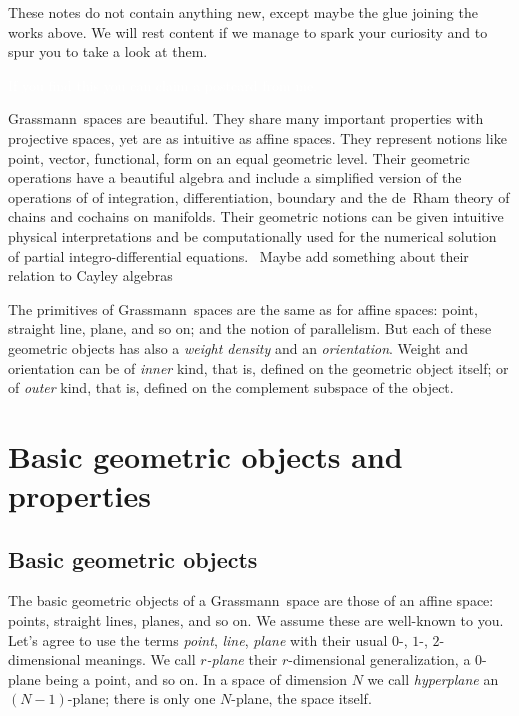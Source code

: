 \documentclass[\ifafour a4paper,12pt,\else a5paper,10pt,\fi%
onecolumn,oneside,article,%
british%
]{memoir}
\theoremstyle{remark}
\theoremstyle{innote}
\renewcommand*{\|}{\nonscript\,\vert\nonscript\;\mathopen{}}
\newcommand*{\puzzle}{{\fontencoding{U}\fontfamily{fontawesometwo}\selectfont\symbol{225}}}
\newcommand{\mynote}[1]{ {\color{notecolour}\puzzle\ #1}}
\newcommand*{\gm}{Grassmann}
\newcommand*{\+}{\boxplus}
\newcommand*{\yr}{r}
\newcommand*{\yN}{N}
\begin{document}
These notes do not contain anything new, except maybe the glue joining the
works above. We will rest content if we manage to spark your curiosity and
to spur you to take a look at them.

\textcolor{white}{If you find this you can claim a postcard from me.}

\gm\ spaces are beautiful. They share many important properties with
projective spaces, yet are as intuitive as affine spaces. They represent
notions like point, vector, functional, form on an equal geometric level.
Their geometric operations have a beautiful algebra and include a
simplified version of the operations of of integration, differentiation,
boundary and the de~Rham theory of chains and cochains on manifolds. Their
geometric notions can be given intuitive physical interpretations and be
computationally used for the numerical solution of partial
integro-differential equations. \mynote{Maybe add something about their
  relation to Cayley algebras}

The primitives of \gm\ spaces are the same as for affine spaces: point,
straight line, plane, and so on; and the notion of parallelism. But each of
these geometric objects has also a \emph{weight density} and an
\emph{orientation}. Weight and orientation can be of \emph{inner} kind,
that is, defined on the geometric object itself; or of \emph{outer} kind,
that is, defined on the complement subspace of the object.


\section{Basic geometric objects and properties}
\label{sec:basic_objects_properties}


\subsection{Basic geometric objects}
\label{sec:points_etc}

The basic geometric objects of a \gm\ space are those of an affine space:
points, straight lines, planes, and so on. We assume these are well-known
to you. Let's agree to use the terms \emph{point}, \emph{line},
\emph{plane} with their usual $0$-, $1$-, $2$-dimensional meanings. We call
\emph{$\yr$-plane} their $\yr$-dimensional generalization, a $0$-plane
being a point, and so on. In a space of dimension $\yN$ we call
\emph{hyperplane} an $(\yN-1)$-plane; there is only one $\yN$-plane, the
space itself.
\end{document}
